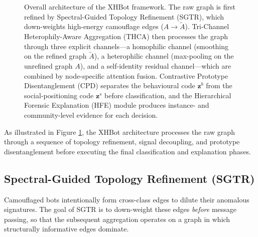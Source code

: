 \begin{figure}[t]
{%
    }
    \caption{Overall architecture of the XHBot framework. The raw graph is first refined by Spectral-Guided Topology Refinement (SGTR), which down-weights high-energy camouflage edges ($A\!\rightarrow\!\tilde{A}$). Tri-Channel Heterophily-Aware Aggregation (THCA) then processes the graph through three explicit channels---a homophilic channel (smoothing on the refined graph $\tilde{A}$), a heterophilic channel (max-pooling on the unrefined graph $A$), and a self-identity residual channel---which are combined by node-specific attention fusion. Contrastive Prototype Disentanglement (CPD) separates the behavioural code $\mathbf{z}^b$ from the social-positioning code $\mathbf{z}^s$ before classification, and the Hierarchical Forensic Explanation (HFE) module produces instance- and community-level evidence for each decision.}
    \label{fig:architecture}
\end{figure}

As illustrated in Figure \ref{fig:architecture}, the XHBot architecture processes the raw graph through a sequence of topology refinement, signal decoupling, and prototype disentanglement before executing the final classification and explanation phases.

\subsection{Spectral-Guided Topology Refinement (SGTR)}
\label{sec:sgtr}
Camouflaged bots intentionally form cross-class edges to dilute their anomalous signatures. The goal of SGTR is to down-weight these edges \emph{before} message passing, so that the subsequent aggregation operates on a graph in which structurally informative edges dominate.

